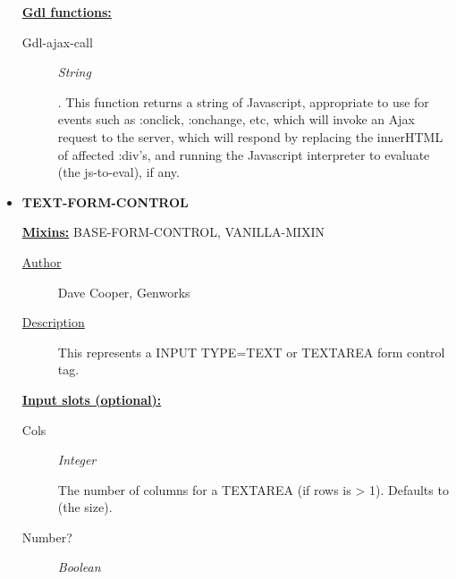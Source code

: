 \documentclass [11pt]{book}
\begin{document}
\begin{itemize}
\textbf{
\underline{Gdl functions:}}

\begin{description}

\item [Gdl-ajax-call]
\emph{String}

.
This function returns a string of Javascript, appropriate to use for events
such as :onclick, :onchange, etc, which will invoke an Ajax request to the
server, which will respond by replacing the innerHTML of affected :div's, and
running the Javascript interpreter to evaluate (the js-to-eval), if any.




\end{description}







\item {}
\textbf{TEXT-FORM-CONTROL}


\textbf{
\underline{Mixins:}} BASE-FORM-CONTROL, VANILLA-MIXIN





\begin{description}

\item [
\underline{Author}]


Dave Cooper, Genworks



\item [
\underline{Description}]


This represents a INPUT TYPE=TEXT or TEXTAREA form control tag.



\end{description}








\textbf{
\underline{Input slots (optional):}}

\begin{description}

\item [Cols]
\emph{Integer}

 The number of columns for a TEXTAREA (if rows is > 1). Defaults to (the size).




\item [Number?]
\emph{Boolean}


\end{description}
\end{itemize}
\end{document}
